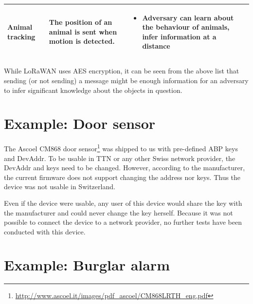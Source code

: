 {\begin{longtable}[c]{|l|l|l|}
\begin{minipage}[t]{0.20\columnwidth}
{Animal tracking}
\strut\end{minipage} &
\begin{minipage}[t]{0.30\columnwidth}\raggedright\strut
{The position of an animal is sent when motion is detected.}
\strut\end{minipage} &
\begin{minipage}[t]{0.40\columnwidth}\raggedright\strut
\begin{itemize}
\tightlist
\item
  {Adversary can learn about the behaviour of animals, infer information
  at a distance}
\end{itemize}
\strut\end{minipage}\tabularnewline
\hline
\end{longtable}

{While LoRaWAN uses AES encryption, it can be seen from the above list
that sending (or not sending) a message might be enough information for
an adversary to infer significant knowledge about the objects in
question.}
\section{\texorpdfstring{{Example: Door
sensor}}{Example: Door sensor}}\label{h.bju94okea6h3}

The Ascoel CM868 door
sensor\footnote{\url{http://www.ascoel.it/images/pdf_ascoel/CM868LRTH_eng.pdf}} was shipped
to us with pre-defined ABP keys and DevAddr. To be usable in TTN or any
other Swiss network provider, the DevAddr and keys need to be changed.
However, according to the manufacturer, the current firmware does not
support changing the address nor keys. Thus the device was not usable in Switzerland.

Even if the device were
usable, any user of this device would share the key with the
manufacturer and could never change the key herself.
Because it was not possible to connect the device to a network provider, no further tests have
been conducted with this device.

\section{\texorpdfstring{{Example:
Burglar alarm}}{Example: Burglar alarm}}\label{h.ajy5u48pfd5q}

}
